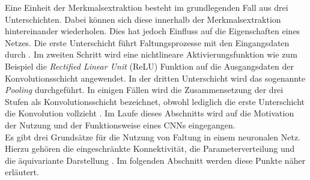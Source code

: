 		
		
	 	
	
		Eine Einheit der Merkmalsextraktion besteht im grundlegenden Fall aus drei Unterschichten. Dabei können sich diese innerhalb der Merkmalsextraktion hintereinander wiederholen. Dies hat jedoch Einfluss auf die Eigenschaften eines Netzes. Die erste Unterschicht führt Faltungsprozesse mit den Eingangsdaten durch \cite{deeplearning}. Im zweiten Schritt wird eine nichtlineare Aktivierungsfunktion wie zum Beispiel die \textit{Rectified Linear Unit} (ReLU) Funktion auf die Ausgangsdaten der Konvolutionsschicht angewendet. In der dritten Unterschicht wird das sogenannte \textit{Pooling} durchgeführt. In einigen Fällen wird die Zusammensetzung der drei Stufen als Konvolutionsschicht bezeichnet, obwohl lediglich die erste Unterschicht die Konvolution vollzieht \cite{deeplearning}. Im Laufe dieses Abschnitts wird auf die Motivation der Nutzung und der Funktionsweise eines CNNs eingegangen.\\
		
		Es gibt drei Grundsätze für die Nutzung von Faltung in einem neuronalen Netz. Hierzu gehören die eingeschränkte Konnektivität, die Parameterverteilung und die äquivariante Darstellung \cite{deeplearning}. Im folgenden Abschnitt werden diese Punkte näher erläutert.\\
		
